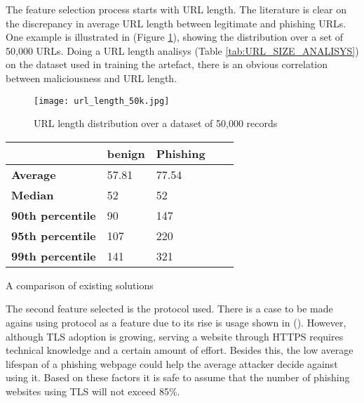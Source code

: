 The feature selection process starts with URL length. The literature is clear on the discrepancy in average URL length between legitimate and phishing URLs. One example is illustrated in \cite{STACKED_ML_URL_HTML} (Figure \ref{fig:URL_LENGTH_DISTRIBUTION}), showing the distribution over a set of 50,000 URLs. Doing a URL length analisys (Table \ref{tab:URL_SIZE_ANALISYS}) on the dataset used in training the artefact, there is an obvious correlation between maliciousness and URL length.

\begin{figure}[t]
	\centering
	\texttt{[image: url\_length\_50k.jpg]}
	\caption{URL length distribution over a dataset of 50,000 records}
	\label{fig:URL_LENGTH_DISTRIBUTION}
\end{figure}

\begin{singlespace}
	\small
	\begin{center}
		\label{tab:URL_SIZE_ANALISYS}
		\begin{tabular}{ | m{8em} | m{13em} | m{8.5em} | m{2.3em} | m{5em} | }
			\hline
			                         & \textbf{benign} & \textbf{Phishing} \\
			\hline
			\textbf{Average}         & 57.81           & 77.54             \\
			\hline
			\textbf{Median}          & 52              & 52                \\
			\hline
			\textbf{90th percentile} & 90              & 147               \\
			\hline
			\textbf{95th percentile} & 107             & 220               \\
			\hline
			\textbf{99th percentile} & 141             & 321               \\
			\hline
		\end{tabular}
		\captionsetup{type=table}\caption{A comparison of existing solutions \citep{INTELLIGENT_PHISHING_ANFIS}}
	\end{center}
\end{singlespace}


The second feature selected is the protocol used. There is a case to be made agains using protocol as a feature due to its rise is usage shown in (). However, although TLS adoption is growing, serving a website through HTTPS requires technical knowledge and a certain amount of effort. Besides this, the low average lifespan of a phishing webpage could help the average attacker decide against using it. Based on these factors it is safe to assume that the number of phishing websites using TLS will not exceed 85\%.

